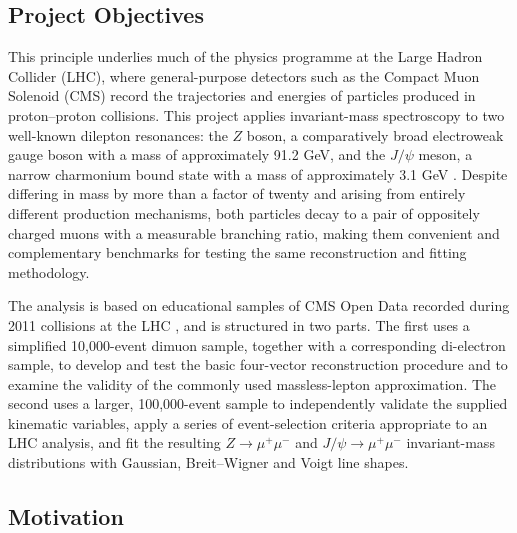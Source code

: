 \documentclass[11pt, a4paper]{article}
\numberwithin{equation}{section}
\begin{document}
\subsection{Project Objectives}

This principle underlies much of the physics programme at the Large Hadron Collider (LHC), where general-purpose detectors such as the Compact Muon Solenoid (CMS) \cite{cmscollaboration2008cms} record the trajectories and energies of particles produced in proton--proton collisions. This project applies invariant-mass spectroscopy to two well-known dilepton resonances: the $Z$ boson, a comparatively broad electroweak gauge boson with a mass of approximately 91.2 GeV, and the $J/\psi$ meson, a narrow charmonium bound state with a mass of approximately 3.1 GeV \cite{pdgtakahashizboson2026review, pdgtakahashijpsi2026review}. Despite differing in mass by more than a factor of twenty and arising from entirely different production mechanisms, both particles decay to a pair of oppositely charged muons with a measurable branching ratio, making them convenient and complementary benchmarks for testing the same reconstruction and fitting methodology.

The analysis is based on educational samples of CMS Open Data recorded during 2011 collisions at the LHC \cite{mccauley2019zmumusimplified, mccauley2019zeesimplified, mccauley2017zmumu, mccauley2017jpsimumu}, and is structured in two parts. The first uses a simplified 10,000-event dimuon sample, together with a corresponding di-electron sample, to develop and test the basic four-vector reconstruction procedure and to examine the validity of the commonly used massless-lepton approximation. The second uses a larger, 100,000-event sample to independently validate the supplied kinematic variables, apply a series of event-selection criteria appropriate to an LHC analysis, and fit the resulting $Z \rightarrow \mu^+\mu^-$ and $J/\psi \rightarrow \mu^+\mu^-$ invariant-mass distributions with Gaussian, Breit--Wigner and Voigt line shapes.

\subsection{Motivation}
\end{document}
